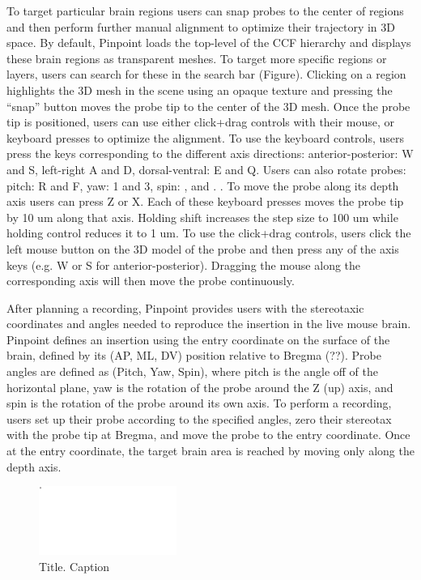 To target particular brain regions users can snap probes to the center of regions and then perform further manual alignment to optimize their trajectory in 3D space. By default, Pinpoint loads the top-level of the CCF hierarchy and displays these brain regions as transparent meshes. To target more specific regions or layers, users can search for these in the search bar (Figure). Clicking on a region highlights the 3D mesh in the scene using an opaque texture and pressing the ``snap'' button moves the probe tip to the center of the 3D mesh. Once the probe tip is positioned, users can use either click+drag controls with their mouse, or keyboard presses to optimize the alignment. To use the keyboard controls, users press the keys corresponding to the different axis directions: anterior-posterior: W and S, left-right A and D, dorsal-ventral: E and Q. Users can also rotate probes: pitch: R and F, yaw: 1 and 3, spin: , and . . To move the probe along its depth axis users can press Z or X. Each of these keyboard presses moves the probe tip by 10 um along that axis. Holding shift increases the step size to 100 um while holding control reduces it to 1 um. To use the click+drag controls, users click the left mouse button on the 3D model of the probe and then press any of the axis keys (e.g. W or S for anterior-posterior). Dragging the mouse along the corresponding axis will then move the probe continuously.

After planning a recording, Pinpoint provides users with the stereotaxic coordinates and angles needed to reproduce the insertion in the live mouse brain. Pinpoint defines an insertion using the entry coordinate on the surface of the brain, defined by its (AP, ML, DV) position relative to Bregma (??). Probe angles are defined as (Pitch, Yaw, Spin), where pitch is the angle off of the horizontal plane, yaw is the rotation of the probe around the Z (up) axis, and spin is the rotation of the probe around its own axis. To perform a recording, users set up their probe according to the specified angles, zero their stereotax with the probe tip at Bregma, and move the probe to the entry coordinate. Once at the entry coordinate, the target brain area is reached by moving only along the depth axis.

\begin{figure}
\centering
\includegraphics[keepaspectratio,width=0.4\textwidth]{figures/figure-2.pdf}
\caption[mini-caption]{Title. Caption}
\label{fig:coordinate_spaces}
\end{figure}

